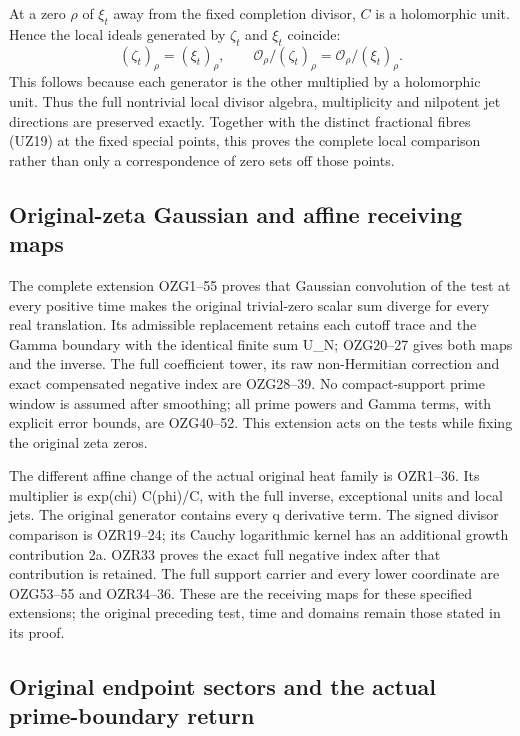 \documentclass[
  10pt,
  a4paper,
]{article}
\begin{document}
At a zero \(\rho\) of \(\xi_t\) away from the fixed completion divisor,
\(C\) is a holomorphic unit. Hence the local ideals generated by
\(\zeta_t\) and \(\xi_t\) coincide: \[
(\zeta_t)_\rho=(\xi_t)_\rho,\qquad
\mathcal O_\rho/(\zeta_t)_\rho
=\mathcal O_\rho/(\xi_t)_\rho.
\tag{UZ53}
\] This follows because each generator is the other multiplied by a
holomorphic unit. Thus the full nontrivial local divisor algebra,
multiplicity and nilpotent jet directions are preserved exactly.
Together with the distinct fractional fibres (UZ19) at the fixed special
points, this proves the complete local comparison rather than only a
correspondence of zero sets off those points.

\subsection{Original-zeta Gaussian and affine receiving
maps}\label{original-zeta-gaussian-and-affine-receiving-maps}

The complete extension OZG1--55 proves that Gaussian convolution of the
test at every positive time makes the original trivial-zero scalar sum
diverge for every real translation. Its admissible replacement retains
each cutoff trace and the Gamma boundary with the identical finite sum
U\_N; OZG20--27 gives both maps and the inverse. The full coefficient
tower, its raw non-Hermitian correction and exact compensated negative
index are OZG28--39. No compact-support prime window is assumed after
smoothing; all prime powers and Gamma terms, with explicit error bounds,
are OZG40--52. This extension acts on the tests while fixing the
original zeta zeros.

The different affine change of the actual original heat family is
OZR1--36. Its multiplier is exp(chi) C(phi)/C, with the full inverse,
exceptional units and local jets. The original generator contains every
q derivative term. The signed divisor comparison is OZR19--24; its
Cauchy logarithmic kernel has an additional growth contribution 2a.
OZR33 proves the exact full negative index after that contribution is
retained. The full support carrier and every lower coordinate are
OZG53--55 and OZR34--36. These are the receiving maps for these
specified extensions; the original preceding test, time and domains
remain those stated in its proof.

\subsection{Original endpoint sectors and the actual prime-boundary
return}\label{original-endpoint-sectors-and-the-actual-prime-boundary-return}
\end{document}
